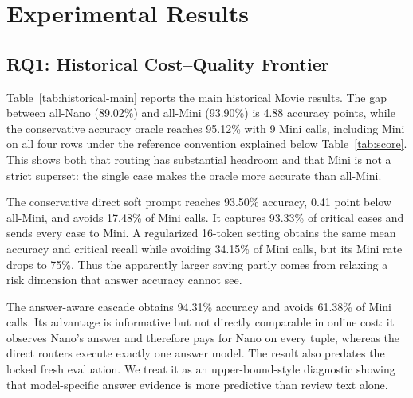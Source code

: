 \section{Experimental Results}
\label{sec:results}

\subsection{RQ1: Historical Cost--Quality Frontier}

Table~\ref{tab:historical-main} reports the main historical Movie results. The
gap between all-Nano (89.02\%) and all-Mini (93.90\%) is 4.88 accuracy points,
while the conservative accuracy oracle reaches 95.12\% with 9 Mini calls,
including Mini on all four \bw rows under the reference convention explained
below Table~\ref{tab:score}. This shows both that routing has substantial headroom and that Mini is not a strict
superset: the single \no case makes the oracle more accurate than all-Mini.

The conservative direct soft prompt reaches 93.50\% accuracy, 0.41 point below
all-Mini, and avoids 17.48\% of Mini calls. It captures 93.33\% of critical
cases and sends every \bw case to Mini. A regularized 16-token setting obtains
the same mean accuracy and critical recall while avoiding 34.15\% of Mini calls,
but its \bw Mini rate drops to 75\%. Thus the apparently larger saving partly
comes from relaxing a risk dimension that answer accuracy cannot see.

The answer-aware cascade obtains 94.31\% accuracy and avoids 61.38\% of Mini
calls. Its advantage is informative but not directly comparable in online
cost: it observes Nano's answer and therefore pays for Nano on every tuple,
whereas the direct routers execute exactly one answer model. The result also
predates the locked fresh evaluation. We treat it as an upper-bound-style
diagnostic showing that model-specific answer evidence is more predictive than
review text alone.

